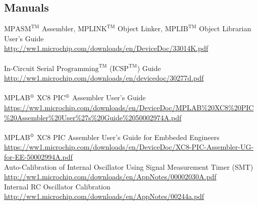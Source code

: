 \documentclass[12pt, letterpaper]{article}
\begin{document}
\subsection{Manuals}
$\text{MPASM}^{\text{TM}}$ Assembler, $\text{MPLINK}^{\text{TM}}$ Object Linker, $\text{MPLIB}^{\text{TM}}$ Object Librarian User's Guide\\
\url{http://ww1.microchip.com/downloads/en/DeviceDoc/33014K.pdf}\\
\\
\noindent In-Circuit Serial $\text{Programming}^{\text{TM}}$ ($\text{ICSP}^{\text{TM}}$) Guide\\
\url{http://ww1.microchip.com/downloads/en/devicedoc/30277d.pdf}\\
\\
MPLAB$^\text{\textregistered}$ XC8 PIC$^\text{\textregistered}$ Assembler User's Guide\\
\url{https://ww1.microchip.com/downloads/en/DeviceDoc/MPLAB%20XC8%20PIC%20Assembler%20User%27s%20Guide%2050002974A.pdf}\\
\\
MPLAB$^\text{\textregistered}$ XC8 PIC Assembler User's Guide for Embbeded Engineers\\
\url{https://ww1.microchip.com/downloads/en/DeviceDoc/XC8-PIC-Assembler-UG-for-EE-50002994A.pdf}\\

\noindent Auto-Calibration of Internal Oscillator Using Signal Measurement Timer (SMT)\\
\url{http://ww1.microchip.com/downloads/en/AppNotes/00002030A.pdf}\\

\noindent Internal RC Oscillator Calibration\\
\url{http://ww1.microchip.com/downloads/en/AppNotes/00244a.pdf}\\
\end{document}
